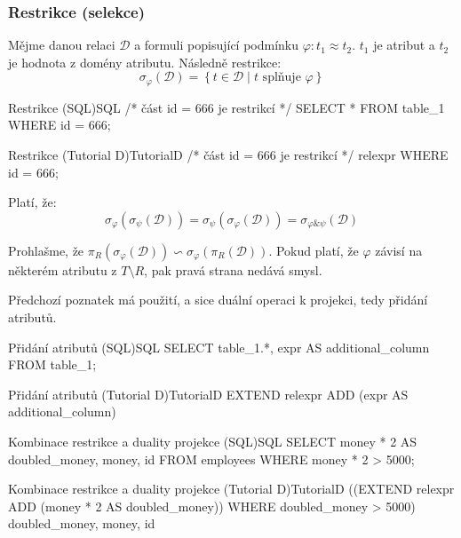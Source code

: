 \subsubsection{Restrikce (selekce)}
Mějme danou relaci $\mathcal{D}$ a formuli popisující podmínku $\varphi : t_{1} \approx t_{2}$. $t_{1}$ je atribut a $t_{2}$ je hodnota z domény atributu. Následně restrikce:
$$
\sigma_{\varphi}(\mathcal{D}) = \left\{ t \in \mathcal{D} \; | \; t \text{ splňuje } \varphi \right\}
$$
\begin{upcode}{Restrikce (SQL)}{}{SQL}
/* část id = 666 je restrikcí */
SELECT * FROM table_1 WHERE id = 666;
\end{upcode}
\begin{upcode}{Restrikce (Tutorial D)}{}{TutorialD}
/* část id = 666 je restrikcí */
relexpr WHERE id = 666;
\end{upcode}
\begin{upquote}
Platí, že:
$$
\sigma_{\varphi}(\sigma_{\psi}(\mathcal{D})) = \sigma_{\psi}(\sigma_{\varphi}(\mathcal{D})) = \sigma_{\varphi \& \psi}(\mathcal{D})
$$
\end{upquote}

Prohlašme, že $\pi_{R} (\sigma_{\varphi} (\mathcal{D})) \backsim \sigma_{\varphi} (\pi_{R} (\mathcal{D}))$. Pokud platí, že $\varphi$ závisí na některém atributu z $T \setminus R$, pak pravá strana nedává smysl.

Předchozí poznatek má použití, a sice duální operaci k projekci, tedy přidání atributů.
\begin{upcode}{Přidání atributů (SQL)}{}{SQL}
SELECT table_1.*, expr AS additional_column FROM table_1;
\end{upcode}
\begin{upcode}{Přidání atributů (Tutorial D)}{}{TutorialD}
EXTEND relexpr ADD (expr AS additional_column)
\end{upcode}
\begin{upcode}{Kombinace restrikce a duality projekce (SQL)}{}{SQL}
SELECT	money * 2 AS doubled_money, money, id
FROM 	employees
WHERE	money * 2 > 5000;
\end{upcode}
\begin{upcode}{Kombinace restrikce a duality projekce (Tutorial D)}{}{TutorialD}
((EXTEND relexpr ADD (money * 2 AS doubled_money))
WHERE doubled_money > 5000) {doubled_money, money, id}
\end{upcode}